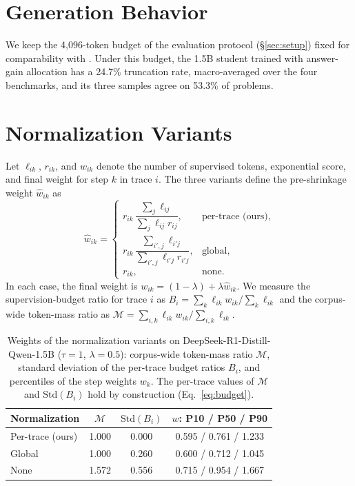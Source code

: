 \documentclass[11pt]{article}
\begin{document}
\section{Generation Behavior}
\label{app:gen}

We keep the 4,096-token budget of the evaluation protocol (\S\ref{sec:setup}) fixed for comparability with \citet{liu2026palign}.
Under this budget, the 1.5B student trained with answer-gain allocation has a 24.7\% truncation rate, macro-averaged over the four benchmarks, and its three samples agree on 53.3\% of problems.


\section{Normalization Variants}
\label{app:norm}

Let $\ell_{ik}$, $r_{ik}$, and $w_{ik}$ denote the number of supervised tokens, exponential score, and final weight for step $k$ in trace $i$. The three variants define the pre-shrinkage weight $\hat w_{ik}$ as
\begin{equation}
\hat w_{ik}=
\begin{cases}
 r_{ik}\,\dfrac{\sum_j\ell_{ij}}{\sum_j\ell_{ij}r_{ij}}, & \text{per-trace (ours)},\\[7pt]
 r_{ik}\,\dfrac{\sum_{i',j}\ell_{i'j}}{\sum_{i',j}\ell_{i'j}r_{i'j}}, & \text{global},\\[7pt]
 r_{ik}, & \text{none}.
\end{cases}
\label{eq:normalization_variants}
\end{equation}
In each case, the final weight is $w_{ik}=(1-\lambda)+\lambda\hat w_{ik}$. We measure the supervision-budget ratio for trace $i$ as $B_i=\sum_k\ell_{ik}w_{ik}/\sum_k\ell_{ik}$ and the corpus-wide token-mass ratio as $\mathcal{M}=\sum_{i,k}\ell_{ik}w_{ik}/\sum_{i,k}\ell_{ik}$.

\begin{table}[t]
  \centering
  \small
  \setlength{\tabcolsep}{3pt}
  \begin{tabular}{lccc}
    \toprule
    Normalization & $\mathcal{M}$ & $\mathrm{Std}(B_i)$ & $w$: P10 / P50 / P90 \\
    \midrule
    Per-trace (ours) & 1.000 & 0.000 & 0.595 / 0.761 / 1.233 \\
    Global & 1.000 & 0.260 & 0.600 / 0.712 / 1.045 \\
    None & 1.572 & 0.556 & 0.715 / 0.954 / 1.667 \\
    \bottomrule
  \end{tabular}
  \caption{Weights of the normalization variants on DeepSeek-R1-Distill-Qwen-1.5B ($\tau=1$, $\lambda=0.5$): corpus-wide token-mass ratio $\mathcal{M}$, standard deviation of the per-trace budget ratios $B_i$, and percentiles of the step weights $w_k$. The per-trace values of $\mathcal{M}$ and $\mathrm{Std}(B_i)$ hold by construction (Eq.~\ref{eq:budget}).}
  \label{tab:norm-diag}
\end{table}
\end{document}
